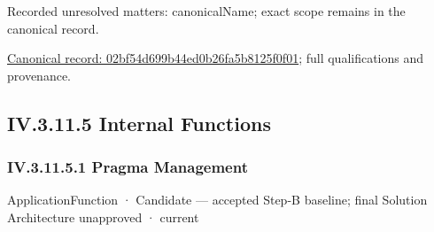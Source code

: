 {\small Recorded unresolved matters: canonicalName; exact scope remains in the canonical record.}\par
{\footnotesize \href{../../../../../../../../continuum/application/application-service/02bf54d699b44ed0b26fa5b8125f0f01.md}{Canonical record: 02bf54d699b44ed0b26fa5b8125f0f01}; full qualifications and provenance.}\par
\subsection*{IV.3.11.5 Internal Functions}
\label{navigation:IV.3.11.5}

\subsubsection*{IV.3.11.5.1 Pragma Management}
\label{navigation:IV.3.11.5.1}

\label{element:ab0cdaa7ed4149ee856216efa5a265c4}
{\small ApplicationFunction · Candidate — accepted Step-B baseline; final Solution Architecture unapproved · current}\par

